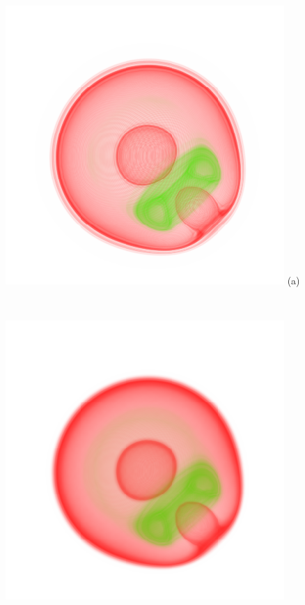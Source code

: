\documentclass[twoside,twocolumn,10pt]{article}
\begin{document}
\begin{figure}
	\centering
	\begin{minipage}{.16\textwidth}
		\centering
		\includegraphics[width=1\linewidth]{crop/nucleon_merged_green_red}
		(a)
	\end{minipage}~
	\begin{minipage}{.16\textwidth}
		\centering
		\includegraphics[width=1\linewidth]{crop/nucleon_merged_segment_green_red}

\end{minipage}
\end{figure}
\end{document}
